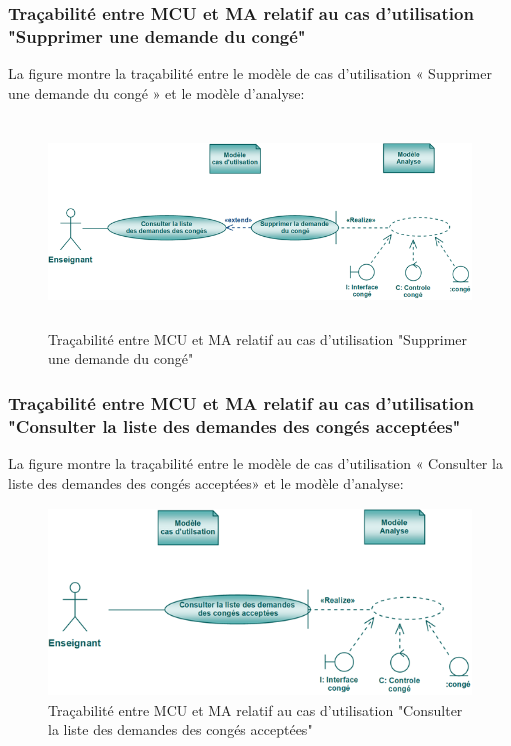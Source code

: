 \documentclass[12 pt ]{report}
\begin{document}
\subsubsection{Traçabilité entre MCU et MA relatif au cas d’utilisation "Supprimer une demande du congé" }
La figure  montre la traçabilité entre le modèle de cas d’utilisation « Supprimer une demande du congé » et le modèle d’analyse:
\begin{figure}[h]
\begin{center}
\includegraphics[width= 14cm , height =5.5cm]{tsc.PNG}
\caption{Traçabilité entre MCU et MA relatif au cas d’utilisation "Supprimer une demande du congé"}
\end{center}
\end{figure}

\subsubsection{Traçabilité entre MCU et MA relatif au cas d’utilisation "Consulter la liste des demandes 
 des congés acceptées" }
La figure  montre la traçabilité entre le modèle de cas d’utilisation « Consulter la liste des demandes 
 des congés acceptées» et le modèle d’analyse:

\begin{figure}[h]
\begin{center}
\includegraphics[width= 14cm , height =5cm]{tccr.png}
\caption{Traçabilité entre MCU et MA relatif au cas d’utilisation "Consulter la liste des demandes 
 des congés acceptées"}
\end{center}
\end{figure}
\end{document}
